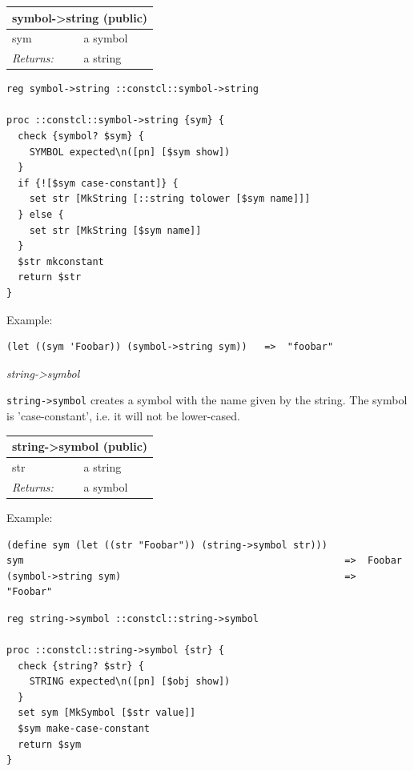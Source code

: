 \documentclass[twoside,9pt]{report}
\begin{document}
\begin{tabular}{ |l l| }
\hline
\multicolumn{2}{|l|}{symbol->string (public)} \\
\hline
sym & a symbol \\
\textit{Returns:} & a string \\
\hline
\end{tabular}

\noindent\makebox[\linewidth]{\rule{\linewidth}{0.4pt}}
\begin{lstlisting}
reg symbol->string ::constcl::symbol->string
 
proc ::constcl::symbol->string {sym} {
  check {symbol? $sym} {
    SYMBOL expected\n([pn] [$sym show])
  }
  if {![$sym case-constant]} {
    set str [MkString [::string tolower [$sym name]]]
  } else {
    set str [MkString [$sym name]]
  }
  $str mkconstant
  return $str
}
\end{lstlisting}
\noindent\makebox[\linewidth]{\rule{\linewidth}{0.4pt}}

Example:

\noindent\makebox[\linewidth]{\rule{\linewidth}{0.4pt}}
\begin{lstlisting}
(let ((sym 'Foobar)) (symbol->string sym))   =>  "foobar"
\end{lstlisting}
\noindent\makebox[\linewidth]{\rule{\linewidth}{0.4pt}}

\emph{string->symbol}


\texttt{string->symbol} creates a symbol with the name given by the string. The symbol is 'case-constant', i.e. it will not be lower-cased.

\begin{tabular}{ |l l| }
\hline
\multicolumn{2}{|l|}{string->symbol (public)} \\
\hline
str & a string \\
\textit{Returns:} & a symbol \\
\hline
\end{tabular}


Example:

\noindent\makebox[\linewidth]{\rule{\linewidth}{0.4pt}}
\begin{lstlisting}
(define sym (let ((str "Foobar")) (string->symbol str)))
sym                                                        =>  Foobar
(symbol->string sym)                                       =>  "Foobar"
\end{lstlisting}
\noindent\makebox[\linewidth]{\rule{\linewidth}{0.4pt}}
\noindent\makebox[\linewidth]{\rule{\linewidth}{0.4pt}}
\begin{lstlisting}
reg string->symbol ::constcl::string->symbol
 
proc ::constcl::string->symbol {str} {
  check {string? $str} {
    STRING expected\n([pn] [$obj show])
  }
  set sym [MkSymbol [$str value]]
  $sym make-case-constant
  return $sym
}
\end{lstlisting}
\noindent\makebox[\linewidth]{\rule{\linewidth}{0.4pt}}
\end{document}
